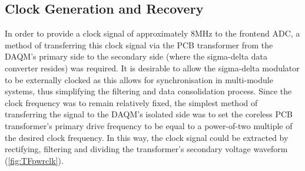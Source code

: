 \documentclass[conference]{IEEEtran}
\begin{document}
	\subsection{Clock Generation and Recovery} %
	In order to provide a clock signal of approximately 8MHz to the frontend ADC, a method of transferring this clock signal via the PCB transformer from the DAQM's primary side to the secondary side (where the sigma-delta data converter resides) was required.  It is desirable to allow the sigma-delta modulator to be externally clocked as this allows for synchronisation in multi-module systems, thus simplifying the filtering and data consolidation process.  Since the clock frequency was to remain relatively fixed, the simplest method of transferring the signal to the DAQM's isolated side was to set the coreless PCB transformer's primary drive frequency to be equal to a power-of-two multiple of the desired clock frequency.  In this way, the clock signal could be extracted by rectifying, filtering and dividing the transformer's secondary voltage waveform (\ref{fig:TFpwrclk}).
	
\end{document}
